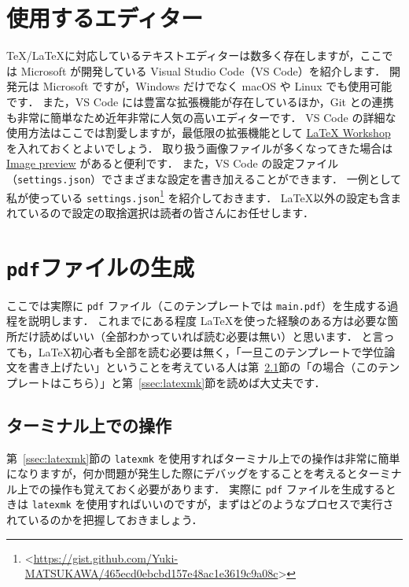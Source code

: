 \section{使用するエディター}
\label{sec:editor}

\TeX/\LaTeX に対応しているテキストエディターは数多く存在しますが，ここでは Microsoft が開発している Visual Studio Code（VS Code）を紹介します．
開発元は Microsoft ですが，Windows だけでなく macOS や Linux でも使用可能です．
また，VS Code には豊富な拡張機能が存在しているほか，Git との連携も非常に簡単なため近年非常に人気の高いエディターです．
VS Code の詳細な使用方法はここでは割愛しますが，最低限の拡張機能として \href{https://marketplace.visualstudio.com/items?itemName=James-Yu.latex-workshop}{LaTeX Workshop} を入れておくとよいでしょう．
取り扱う画像ファイルが多くなってきた場合は \href{https://marketplace.visualstudio.com/items?itemName=kisstkondoros.vscode-gutter-preview}{Image preview} があると便利です．
また，VS Code の設定ファイル（\verb|settings.json|）でさまざまな設定を書き加えることができます．
一例として私が使っている \verb|settings.json|\footnote{\textless\url{https://gist.github.com/Yuki-MATSUKAWA/465ecd0ebcbd157e48ac1e3619c9a08c}\textgreater} を紹介しておきます．
\LaTeX 以外の設定も含まれているので設定の取捨選択は読者の皆さんにお任せします．

\section{\texttt{pdf}ファイルの生成}
\label{sec:makepdf}

ここでは実際に \verb|pdf| ファイル（このテンプレートでは \verb|main.pdf|）を生成する過程を説明します．
これまでにある程度 \LaTeX を使った経験のある方は必要な箇所だけ読めばいい（全部わかっていれば読む必要は無い）と思います．
と言っても，\LaTeX 初心者も全部を読む必要は無く，「一旦このテンプレートで学位論文を書き上げたい」ということを考えている人は第~\ref{ssec:terminal}節の「\LuaLaTeX の場合（このテンプレートはこちら）」と第~\ref{ssec:latexmk}節を読めば大丈夫です．

\subsection{ターミナル上での操作}
\label{ssec:terminal}

第~\ref{ssec:latexmk}節の \verb|latexmk| を使用すればターミナル上での操作は非常に簡単になりますが，何か問題が発生した際にデバッグをすることを考えるとターミナル上での操作も覚えておく必要があります．
実際に \verb|pdf| ファイルを生成するときは \verb|latexmk| を使用すればいいのですが，まずはどのようなプロセスで実行されているのかを把握しておきましょう．

